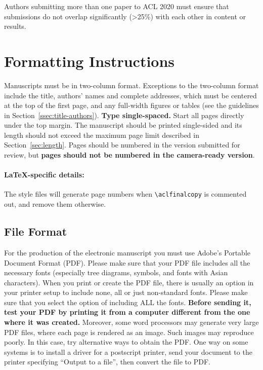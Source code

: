 \documentclass[11pt,a4paper]{article}
\begin{document}
Authors submitting more than one paper to ACL 2020 must ensure that submissions do not overlap significantly (>25\%) with each other in content or results.



\section{Formatting Instructions}

Manuscripts must be in two-column format.
Exceptions to the two-column format include the title, authors' names and complete addresses, which must be centered at the top of the first page, and any full-width figures or tables (see the guidelines in Section~\ref{ssec:title-authors}).
\textbf{Type single-spaced.}
Start all pages directly under the top margin.
The manuscript should be printed single-sided and its length should not exceed the maximum page limit described in Section~\ref{sec:length}.
Pages should be numbered in the version submitted for review, but \textbf{pages should not be numbered in the camera-ready version}.

\paragraph{\LaTeX-specific details:}
The style files will generate page numbers when {\small\verb|\aclfinalcopy|} is commented out, and remove them otherwise.


\subsection{File Format}
\label{sect:pdf}

For the production of the electronic manuscript you must use Adobe's Portable Document Format (PDF).
Please make sure that your PDF file includes all the necessary fonts (especially tree diagrams, symbols, and fonts with Asian characters).
When you print or create the PDF file, there is usually an option in your printer setup to include none, all or just non-standard fonts.
Please make sure that you select the option of including ALL the fonts.
\textbf{Before sending it, test your PDF by printing it from a computer different from the one where it was created.}
Moreover, some word processors may generate very large PDF files, where each page is rendered as an image.
Such images may reproduce poorly.
In this case, try alternative ways to obtain the PDF.
One way on some systems is to install a driver for a postscript printer, send your document to the printer specifying ``Output to a file'', then convert the file to PDF.
\end{document}
